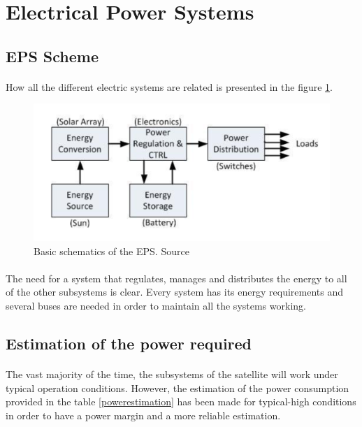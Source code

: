 \section{Electrical Power Systems}
\subsection{EPS Scheme}

\paragraph{}How all the different electric systems are related is presented in the figure \ref{epsbasics}.

\begin{figure}[h]
\includegraphics[scale=0.6]{./sections/SatelliteDept/sections/images/epsbasics}
\centering
\caption{Basic schematics of the EPS. Source \cite{epsbasics}} 
\label{epsbasics}
\end{figure}

\paragraph{}The need for a system that regulates, manages and distributes the energy to all of the other subsystems is clear. Every system has its energy requirements and several buses are needed in order to maintain all the systems working.

\subsection{Estimation of the power required}

\paragraph{}The vast majority of the time, the subsystems of the satellite will work under typical operation conditions. However, the estimation of the power consumption provided in the table \ref{powerestimation} has been made for typical-high conditions in order to have a power margin and a more reliable estimation.

